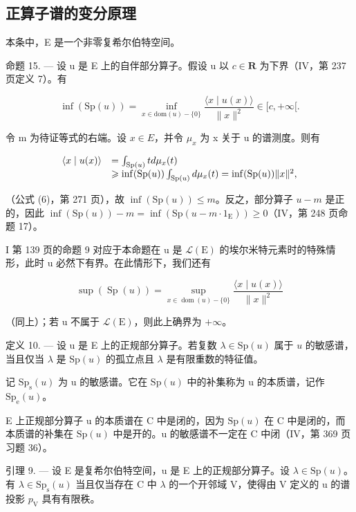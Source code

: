 \subsection{正算子谱的变分原理}

本条中，E 是一个非零复希尔伯特空间。

命题 15. --- 设 u 是 E 上的自伴部分算子。假设 u 以 \(c \in \mathbf{R}\) 为下界（IV，第 237 页定义 7）。有

\[
\inf (\mathrm{Sp} (u)) = \inf _ {x \in \mathrm{dom} (u) - \{0 \}} \frac {\langle x \mid u (x) \rangle}{\| x \| ^ {2}} \in [ c, + \infty [.
\]

令 m 为待证等式的右端。设 \(x \in E\)，并令 \(\mu_{x}\) 为 x 关于 u 的谱测度。则有

\[
\begin{array}{r l} \langle x \mid u (x) \rangle & = \int_ {\mathrm{Sp} (u)} t d \mu_ {x} (t) \\ & \geqslant \inf (\mathrm{Sp} (u)) \int_ {\mathrm{Sp} (u)} d \mu_ {x} (t) = \inf (\mathrm{Sp} (u)) \| x \| ^ {2}, \end{array}
\]

（公式 (6)，第 271 页），故 \(\inf(\mathrm{Sp}(u)) \leqslant m\)。反之，部分算子 \(u - m\) 是正的，因此 \(\inf(\mathrm{Sp}(u)) - m = \inf(\mathrm{Sp}(u - m \cdot 1_{\mathrm{E}})) \geqslant 0\)（IV，第 248 页命题 17）。

I 第 139 页的命题 9 对应于本命题在 u 是 \(\mathcal{L}(\mathrm{E})\) 的埃尔米特元素时的特殊情形，此时 u 必然下有界。在此情形下，我们还有

\[
\sup (\operatorname{Sp} (u)) = \sup _ {x \in \operatorname{dom} (u) - \{0 \}} \frac {\langle x \mid u (x) \rangle}{\| x \| ^ {2}}
\]

（同上）；若 u 不属于 \(\mathcal{L}(\mathrm{E})\)，则此上确界为 \(+\infty\)。

定义 10. --- 设 u 是 E 上的正规部分算子。若复数 \(\lambda \in \mathrm{Sp}(u)\) 属于 \(u\) 的敏感谱，当且仅当 \(\lambda\) 是 \(\mathrm{Sp}(u)\) 的孤立点且 \(\lambda\) 是有限重数的特征值。

记 \(\mathrm{Sp}_{\mathrm{s}}(u)\) 为 u 的敏感谱。它在 \(\mathrm{Sp}(u)\) 中的补集称为 u 的本质谱，记作 \(\mathrm{Sp}_{\mathrm{e}}(u)\)。

E 上正规部分算子 u 的本质谱在 C 中是闭的，因为 \(\mathrm{Sp}(u)\) 在 C 中是闭的，而本质谱的补集在 \(\mathrm{Sp}(u)\) 中是开的。u 的敏感谱不一定在 C 中闭（IV，第 369 页习题 36）。

引理 9. --- 设 E 是复希尔伯特空间，u 是 E 上的正规部分算子。设 \(\lambda \in \mathrm{Sp}(u)\)。有 \(\lambda \in \mathrm{Sp}_{\mathrm{s}}(u)\) 当且仅当存在 C 中 \(\lambda\) 的一个开邻域 V，使得由 V 定义的 u 的谱投影 \(p_{\mathrm{V}}\) 具有有限秩。

